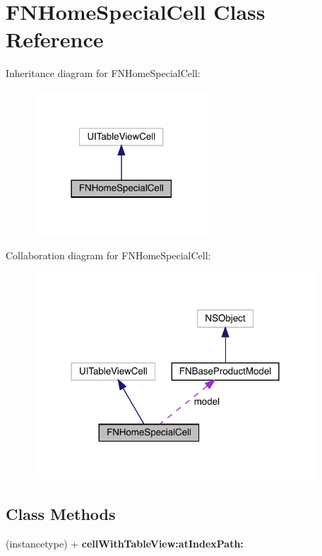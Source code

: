 \hypertarget{interface_f_n_home_special_cell}{}\section{F\+N\+Home\+Special\+Cell Class Reference}
\label{interface_f_n_home_special_cell}


Inheritance diagram for F\+N\+Home\+Special\+Cell\+:\nopagebreak
\begin{figure}[H]
\begin{center}
\leavevmode
\includegraphics[width=186pt]{interface_f_n_home_special_cell__inherit__graph}
\end{center}
\end{figure}


Collaboration diagram for F\+N\+Home\+Special\+Cell\+:\nopagebreak
\begin{figure}[H]
\begin{center}
\leavevmode
\includegraphics[width=300pt]{interface_f_n_home_special_cell__coll__graph}
\end{center}
\end{figure}
\subsection*{Class Methods}
\begin{DoxyCompactItemize}
\item 
\mbox{\label{interface_f_n_home_special_cell_a11693ea2539472da222f219cd147d4bd}} 
(instancetype) + {\bfseries cell\+With\+Table\+View\+:at\+Index\+Path\+:}
\end{DoxyCompactItemize}

